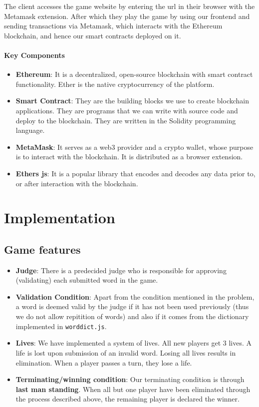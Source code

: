 \documentclass{article}
\begin{document}
The client accesses the game website by entering the url in their browser with the Metamask extension. 
After which they play the game by using our frontend and sending transactions via Metamask, which interacts with the Ethereum blockchain, and hence our smart contracts deployed on it.

\paragraph{Key Components}
\begin{itemize}
\item[] \textbf{Ethereum}: It is a decentralized, open-source blockchain with smart contract functionality. Ether is the native cryptocurrency of the platform.
\item[] \textbf{Smart Contract}: They are the building blocks we use to create blockchain applications. They are programs that we can write with source code and deploy to the blockchain. They are written in the Solidity programming language. 
\item[] \textbf{MetaMask}: It serves as a web3 provider and a crypto wallet, whose purpose is to interact with the blockchain. It is distributed as a browser extension. 
\item[] \textbf{Ethers js}: It is a popular library that encodes and decodes any data prior to, or after interaction with the blockchain.

\end{itemize}



\section{Implementation}

\subsection{Game features}

\begin{itemize}
    \item[] \textbf{Judge}:
    There is a predecided judge who is responsible for approving (validating) each
    submitted word in the game.
    \item[] \textbf{Validation Condition}:
    Apart from the condition mentioned in the problem, a word is deemed valid by the
    judge if it has not been used previously (thus we do not allow repitition of words)
    and also if it comes from the dictionary implemented in \verb|worddict.js|.
    \item[] \textbf{Lives}:
    We have implemented a system of lives. All new players get 3 lives. A life is lost upon submission of an invalid word. Losing all lives results in elimination. When a player passes a turn, they lose a life. 
    \item[] \textbf{Terminating/winning condition}: 
    Our terminating condition is through \textbf{last man standing}. When all but one
    player have been eliminated through the process described above, the remaining
    player is declared the winner.
    
\end{itemize}
\end{document}
